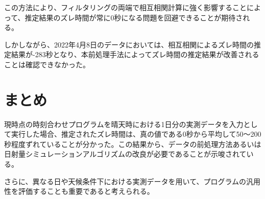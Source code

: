 \documentclass[a4j,12pt,]{jarticle}
\begin{document}
この方法により、フィルタリングの両端で相互相関計算に強く影響することによって、推定結果のズレ時間が常に0秒になる問題を回避できることが期待される。

しかしながら、2022年4月8日のデータにおいては、相互相関によるズレ時間の推定結果が-283秒となり、本前処理手法によってズレ時間の推定結果が改善されることは確認できなかった。

\section{まとめ}
現時点の時刻合わせプログラムを晴天時における1日分の実測データを入力として実行した場合、推定されたズレ時間は、真の値である0秒から平均して50〜200秒程度ずれていることが分かった。この結果から、データの前処理方法あるいは日射量シミュレーションアルゴリズムの改良が必要であることが示唆されている。

さらに、異なる日や天候条件下における実測データを用いて、プログラムの汎用性を評価することも重要であると考えられる。
\end{document}
